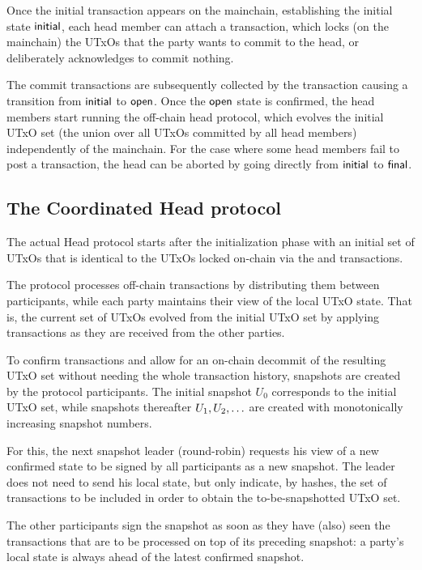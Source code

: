 

Once the initial transaction appears on the mainchain, establishing the initial
state $\mathsf{initial}$, each head member can attach a \mtxCom{} transaction, which
locks (on the mainchain) the UTxOs that the party wants to commit to the head,
or deliberately acknowledges to commit nothing.

The commit transactions are subsequently collected by the \mtxCCom{} transaction
causing a transition from $\mathsf{initial}$ to $\mathsf{open}$. Once the $\mathsf{open}$ state is
confirmed, the head members start running the off-chain head protocol, which
evolves the initial UTxO set (the union over all UTxOs committed by all head
members) independently of the mainchain. For the case where some head members
fail to post a \mtxCom{} transaction, the head can be aborted by going directly
from $\mathsf{initial}$ to $\mathsf{final}$.
\subsection{The Coordinated Head protocol}

The actual Head protocol starts after the initialization phase with an initial
set of UTxOs that is identical to the UTxOs locked on-chain via the \mtxCom{}
and \mtxCCom{} transactions.

The protocol processes off-chain transactions by distributing them between participants,
while each party maintains their view of the local UTxO state. That is, the current
set of UTxOs evolved from the initial UTxO set by applying transactions as they
are received from the other parties.

To confirm transactions and allow for an on-chain decommit of the resulting UTxO
set without needing the whole transaction history, snapshots are created by the
protocol participants. The initial snapshot $U_{0}$ corresponds to the initial
UTxO set, while snapshots thereafter $U_1,U_2,\ldots$ are created with
monotonically increasing snapshot numbers.

For this, the next snapshot leader (round-robin) requests his view of a new confirmed state to be
signed by all participants as a new snapshot. The leader does not need to send his local state,
but only indicate, by hashes, the set of transactions to be included in order to
obtain the to-be-snapshotted UTxO set.

The other participants sign the snapshot as soon as they have (also) seen the
transactions that are to be processed on top of its preceding snapshot: a
party's local state is always ahead of the latest confirmed snapshot.

